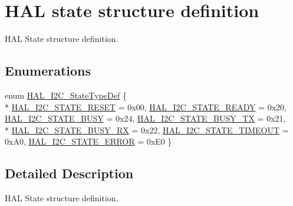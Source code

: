 \hypertarget{group___h_a_l__state__structure__definition}{\section{H\-A\-L state structure definition}
\label{group___h_a_l__state__structure__definition}
}


H\-A\-L State structure definition.  


\subsection*{Enumerations}
\begin{DoxyCompactItemize}
\item 
enum \hyperlink{group___h_a_l__state__structure__definition_gaef355af8eab251ae2a19ee164ad81c37}{H\-A\-L\-\_\-\-I2\-C\-\_\-\-State\-Type\-Def} \{ \\*
\hyperlink{group___h_a_l__state__structure__definition_ggaef355af8eab251ae2a19ee164ad81c37a91ba08634e08d7287940f1bc5a37eeff}{H\-A\-L\-\_\-\-I2\-C\-\_\-\-S\-T\-A\-T\-E\-\_\-\-R\-E\-S\-E\-T} = 0x00, 
\hyperlink{group___h_a_l__state__structure__definition_ggaef355af8eab251ae2a19ee164ad81c37af859ce60c5e462b0bfde3a5010bc72d1}{H\-A\-L\-\_\-\-I2\-C\-\_\-\-S\-T\-A\-T\-E\-\_\-\-R\-E\-A\-D\-Y} = 0x20, 
\hyperlink{group___h_a_l__state__structure__definition_ggaef355af8eab251ae2a19ee164ad81c37a0c503d6c0388f0d872b368557e278b5a}{H\-A\-L\-\_\-\-I2\-C\-\_\-\-S\-T\-A\-T\-E\-\_\-\-B\-U\-S\-Y} = 0x24, 
\hyperlink{group___h_a_l__state__structure__definition_ggaef355af8eab251ae2a19ee164ad81c37acb3a9e3d4d1076e0f4e65f91ca0161bc}{H\-A\-L\-\_\-\-I2\-C\-\_\-\-S\-T\-A\-T\-E\-\_\-\-B\-U\-S\-Y\-\_\-\-T\-X} = 0x21, 
\\*
\hyperlink{group___h_a_l__state__structure__definition_ggaef355af8eab251ae2a19ee164ad81c37a4ea4ecc2dc3cb64c4877c123d9d73170}{H\-A\-L\-\_\-\-I2\-C\-\_\-\-S\-T\-A\-T\-E\-\_\-\-B\-U\-S\-Y\-\_\-\-R\-X} = 0x22, 
\hyperlink{group___h_a_l__state__structure__definition_ggaef355af8eab251ae2a19ee164ad81c37a378abf24301fe7a23620fd78ff3f168b}{H\-A\-L\-\_\-\-I2\-C\-\_\-\-S\-T\-A\-T\-E\-\_\-\-T\-I\-M\-E\-O\-U\-T} = 0x\-A0, 
\hyperlink{group___h_a_l__state__structure__definition_ggaef355af8eab251ae2a19ee164ad81c37afe3c9b304462901099426a0d414be2a2}{H\-A\-L\-\_\-\-I2\-C\-\_\-\-S\-T\-A\-T\-E\-\_\-\-E\-R\-R\-O\-R} = 0x\-E0
 \}
\end{DoxyCompactItemize}


\subsection{Detailed Description}
H\-A\-L State structure definition. 

